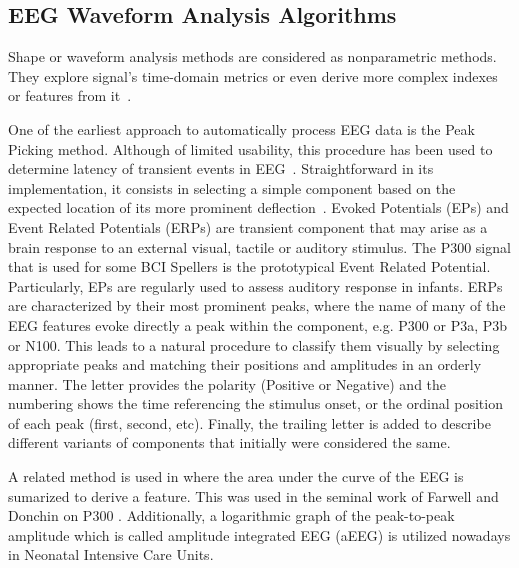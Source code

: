 
\subsection{EEG Waveform Analysis Algorithms}
\label{waveformalgorithms}

Shape or waveform analysis methods are considered as nonparametric methods.  They explore signal's time-domain metrics or even derive more complex indexes or features from it~\cite{Thakor2009}. 

One of the earliest approach to automatically process EEG data is the Peak Picking method.  Although of limited usability, this procedure has been used to determine latency of transient events in EEG~\cite{Jaskowski2000,Zhang2011}.  Straightforward in its implementation, it consists in selecting a simple component based on the expected location of its more prominent deflection~\cite{Ouyang2017}.  Evoked Potentials (EPs) and Event Related Potentials (ERPs) are transient component that may arise as a brain response to an external visual, tactile or auditory stimulus.  The P300 signal that is used for some BCI Spellers is the prototypical Event Related Potential.  Particularly, EPs are regularly used to assess auditory response in infants. ERPs are characterized by their most prominent peaks, where the name of many of the EEG features evoke directly a peak within the component, e.g. P300 or P3a, P3b or N100.  This leads to a natural procedure to classify them visually by selecting appropriate peaks and matching their positions and amplitudes in an orderly manner.  The letter provides the polarity (Positive or Negative) and the numbering shows the time referencing the stimulus onset, or the ordinal position of each peak (first, second, etc).   Finally, the trailing letter is added to describe different variants of components that initially were considered the same.

A related method is used in \cite{Alvarado-Gonzalez2016} where the area under the curve of the EEG is sumarized to derive a feature.  This was used in the seminal work of Farwell and Donchin on P300 \cite{Farwell1988,WolpawJonathanR2012}. Additionally, a logarithmic graph of the peak-to-peak amplitude which is called amplitude integrated EEG (aEEG) \cite{Shah2015} is utilized nowadays in Neonatal Intensive Care Units.

